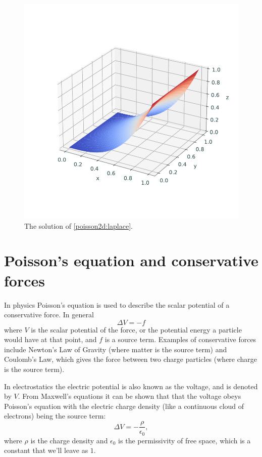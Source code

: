 \begin{figure}
\includegraphics[width=\textwidth]{figures/poisson_square.pdf}
\caption{The solution of \eqref{poisson2d:laplace}.}
\end{figure}

\section*{Poisson's equation and conservative forces}
In physics Poisson's equation is used to describe the scalar potential of a conservative force.
In general
\[ \Delta V = - f\]
where $V$ is the scalar potential of the force, or the potential energy a particle would have at that point, and $f$ is a source term.
Examples of conservative forces include Newton's Law of Gravity (where matter is the source term) and Coulomb's Law, which gives the force between two charge particles (where charge is the source term).

In electrostatics the electric potential is also known as the voltage, and is denoted by $V.$ 
From Maxwell's equations it can be shown that that the voltage obeys Poisson's equation with the electric charge density (like a continuous cloud of electrons) being the source term: 
\[
 \Delta V = -\frac{\rho}{\epsilon_0},
\]
where $\rho$ is the charge density and $\epsilon_0$ is the permissivity of 
free space, which is a constant that we'll leave as $1$.

